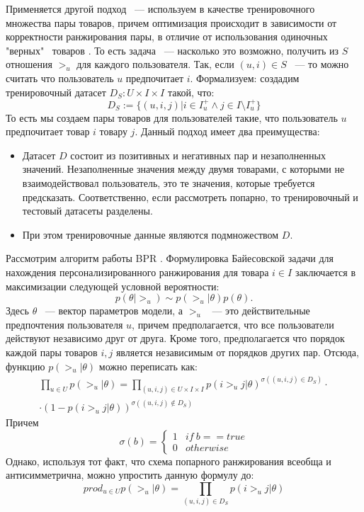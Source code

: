 \documentclass[14pt]{mmcs_article}
\begin{document}
 Применяется другой подход ~--- используем в качестве тренировочного множества пары товаров, причем оптимизация происходит в зависимости от корректности ранжирования пары, в отличие от использования одиночных "верных" \  товаров \cite{BPR:1205}. То есть задача ~--- насколько это возможно, получить из $S$ отношения $>_u$ для каждого пользователя. Так, если $ (u,i) \in S $ ~--- то можно считать что пользователь $ u $ предпочитает $ i $. Формализуем: создадим тренировочный датасет $ D_S: U \times I \times I $ такой, что:
\begin{equation}
	D_S := \{ (u,i,j) | i \in I_u^+ \wedge j \in I \setminus I_u^+ \}
\end{equation}
То есть мы создаем пары товаров для пользователей такие, что пользователь $ u $ предпочитает товар $ i $ товару $ j $.
Данный подход имеет два преимущества:
\begin{itemize}
	\item Датасет $D$ состоит из позитивных и негативных пар и незаполненных значений. Незаполненные значения между двумя товарами, с которыми не взаимодействовал пользователь, это те значения, которые требуется предсказать. Соответственно, если рассмотреть попарно, то тренировочный и тестовый датасеты разделены.
	\item При этом тренировочные данные являются подмножеством $D$. 
\end{itemize}     

Рассмотрим алгоритм работы BPR \cite{BPR:1205}.
Формулировка Байесовской задачи для нахождения персонализированного ранжирования для товара $  i \in I$ заключается в максимизации следующей условной вероятности:
\begin{equation}
	p(\theta | >_u) \sim p(>_u | \theta)p(\theta).
\end{equation} 
Здесь $\theta$ ~--- вектор параметров модели, а $ >_u $ ~--- это действительные предпочтения пользователя $ u $, причем предполагается, что все пользователи действуют независимо друг от друга. Кроме того, предполагается что порядок каждой пары товаров $ i,j $ является независимым от порядков других пар. Отсюда, функцию $ p(>_u | \theta) $ можно 
переписать как:
\begin{multline}
	\prod_{u \in U} p(>_u | \theta) = 	\prod_{(u,i,j) \in U \times I \times I} p(i >_u j | \theta )^{\sigma((u,i,j) \in D_S)} \cdot \\ \cdot (1 - p(i >_u j | \theta ))^{\sigma((u,i,j) \notin D_S)}
\end{multline}
Причем
\begin{equation}
	\sigma(b) = \begin{cases}
		1 & if \ b == true \\
		0 & otherwise
	\end{cases}
\end{equation}
Однако, используя тот факт, что схема попарного ранжирования всеобща и антисимметрична, можно упростить данную формулу до:
\begin{equation}
	prod_{u \in U} p(>_u | \theta) = \prod_{(u,i,j) \in D_S} p(i >_u j | \theta)
\end{equation}
\end{document}
